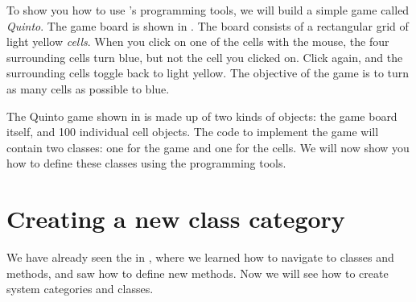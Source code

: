\documentclass[a4paper,10pt,twoside]{book}
\begin{document}
To show you how to use \squeak's programming tools, we will build a simple game called \emph{Quinto}.
The game board is shown in . The board consists of a rectangular grid of light yellow \emph{cells}.
When you click on one of the cells with the mouse, the four surrounding cells turn blue, but not the cell you clicked on.
Click again, and the surrounding cells toggle back to light yellow.
The objective of the game is to turn as many cells as possible to blue.

The Quinto game shown in  is made up of two kinds of objects: the game board itself, and 100 individual cell objects.
The \squeak code to implement the game will contain two classes: one for the game and one for the cells.
We will now show you how to define these classes using the \squeak programming tools.

\section{Creating a new class category}

We have already seen the  in , where we learned how to navigate to classes and methods, and saw how to define new methods.
Now we will see how to create system categories and classes.

\end{document}
